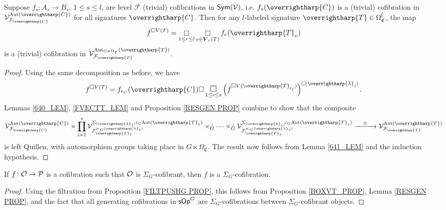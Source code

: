 \documentclass[a4paper,10pt
,draft
]{article}%
\renewcommand{\F}{\mathcal F}
\renewcommand{\1}{\eta}%
\newcommand{\vect}[1]{\text{\overrightharp{\ensuremath{#1}}}}
\begin{document}
\begin{proposition}
      \label{BOXVT_PROP}
      Suppose $f_s: A_s \to B_s$, $1 \leq s \leq l$, are level $\F$ (trivial) cofibrations in $\mathsf{Sym}(\mathcal V)$, i.e. $f_s(\vect C)$ is a (trivial) cofibration in $\V^{\Aut(\vect C)}_{\F_{\vect C}}$ for all signatures $\vect C$.
      Then for any $\underline{l}$-labeled signature $\vect T \in \Omega^{\underline{l}}_{\mathfrak C}$, the map
      \[
            f^{\square V(T)} = \mathop{\square}\limits_{1 \leq r \leq l} \mathop{\square}\limits_{v \in \boldsymbol{V}_r(T)} f_r(\vect T_v)
      \]
      is a (trivial) cofibration in $\V^{\Aut_{G \ltimes \Omega_{\mathfrak C}}(\vect T)}_{\F_{\vect T}}$.
\end{proposition}
\begin{proof}
      Using the same decomposition as before, we have
      \[
            f^{\square V(T)} = f_{r_C}(\vect C) \square \mathop{\mathlarger{\square}}\limits_{1 \leq i \leq s}\left(f^{\square V(\vect T_{i_j})}\right)^{\square |\vect \lambda_j|}.
      \]
      Lemmas \ref{640_LEM}, \ref{FVECTT_LEM} and Proposition \ref{RESGEN PROP} combine to show that the composite
      \[
            \V^{\Aut(\vect C)}_{\F_{\vect C}} \times
            \prod_{i=1}^s
            \V^{\Sigma_{|\vect \lambda_1|} \wr_G \Aut(\vect T_1)}_{\F_{\vect T_1}^{\ltimes_G |\vect \lambda_1|}}
            \times_G^\lrcorner
            \dots
            \times_G^\lrcorner
            \V^{\Sigma_{|\vect \lambda_s|} \wr_G \Aut(\vect T_s)}_{\F_{\vect T_s}^{\ltimes_G |\vect \lambda_s|}}
            \xrightarrow{\quad \otimes \quad}
            \V^{\Aut(\vect T)}_{\F_{\vect T}}
      \]
      is left Quillen,
      with automorphism groups taking place in $G \ltimes \Omega_{\mathfrak C}$. 
      The result now follows from Lemma \ref{641_LEM} and the induction hypothesis.
\end{proof}


\begin{corollary}
      \label{SIGMAG_COF_COR}
      If $f \colon \mathcal{O} \to \mathcal{P}$ is a cofibration such that $\mathcal{O}$ is $\Sigma_G$-cofibrant, then $f$ is a $\Sigma_G$-cofibration.
\end{corollary}
\begin{proof}
      Using the filtration from Proposition \ref{FILTPUSHG PROP},
      this follows from Proposition \ref{BOXVT_PROP}, Lemma \ref{RESGEN PROP}, and the fact that all generating cofibrations in $\mathsf{sOp}^G$ are $\Sigma_G$-cofibrations between $\Sigma_G$-cofibrant objects.
\end{proof}
\end{document}

